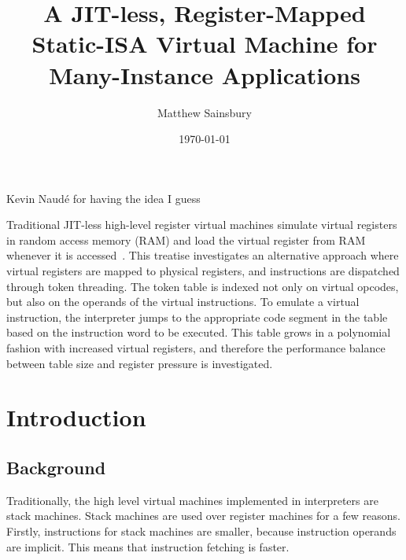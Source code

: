 



\title{A JIT-less, Register-Mapped Static-ISA Virtual Machine for Many-Instance Applications}
\author{Matthew Sainsbury}
\date{\today}

\begin{titlepage}
	\maketitle
\end{titlepage}


Kevin Naudé for having the idea I guess

Traditional JIT-less high-level register virtual machines simulate virtual registers in random access memory (RAM) and load the virtual register from RAM whenever it is accessed~\citep{caseregistervm}. This treatise investigates an alternative approach where virtual registers are mapped to physical registers, and instructions are dispatched through token threading. The token table is indexed not only on virtual opcodes, but also on the operands of the virtual instructions. To emulate a virtual instruction, the interpreter jumps to the appropriate code segment in the table based on the instruction word to be executed. This table grows in a polynomial fashion with increased virtual registers, and therefore the performance balance between table size and register pressure is investigated.


\tableofcontents



\chapter{Introduction}
	\startrealnumbers
		
	\section{Background}
	Traditionally, the high level virtual machines implemented in interpreters are stack machines. Stack machines are used over register machines for a few reasons. Firstly, instructions for stack machines are smaller, because instruction operands are implicit.  This means that instruction fetching is faster. 
	

